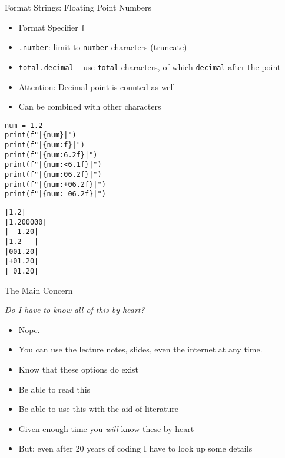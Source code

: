 \begin{frame}[fragile]{Format Strings: Floating Point Numbers}
%
\begin{itemize}
\item Format Specifier \texttt{f}
\item \texttt{.number}: limit to \texttt{number} characters (truncate)
\item \texttt{total.decimal} -- use \texttt{total} characters, of which \texttt{decimal} after the point
\item Attention: Decimal point is counted as well
\item Can be combined with other characters
\end{itemize}
%
\begin{codebox}[Code: Format Strings (4), width=.49\linewidth, nobeforeafter, equal height group = grpFormatString4]
\begin{verbatim}
num = 1.2
print(f"|{num}|")
print(f"|{num:f}|")
print(f"|{num:6.2f}|")
print(f"|{num:<6.1f}|")
print(f"|{num:06.2f}|")
print(f"|{num:+06.2f}|")
print(f"|{num: 06.2f}|")
\end{verbatim}
\end{codebox}
%
\begin{cmdbox}[Output: Format Strings (4), width=.49\linewidth, nobeforeafter, equal height group = grpFormatString4]
\begin{verbatim}
|1.2|
|1.200000|
|  1.20|
|1.2   |
|001.20|
|+01.20|
| 01.20|
\end{verbatim}
\end{cmdbox}
%
\end{frame}


\begin{frame}{The Main Concern}
%
\begin{center}
\begin{Large}
\emph{Do I have to know all of this by heart?}
\end{Large}
\end{center}
%
\begin{itemize}
\item Nope.
\item You can use the lecture notes, slides, even the internet at any time.
\item Know that these options do exist
\item Be able to read this
\item Be able to use this with the aid of literature
\item Given enough time you \emph{will} know these by heart
\item But: even after 20 years of coding I have to look up some details
\end{itemize}
%
\end{frame}

